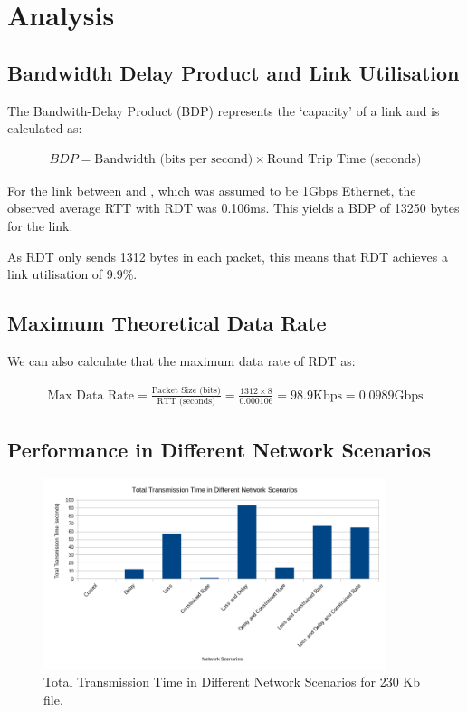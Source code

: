 \section{Analysis}

\subsection{Bandwidth Delay Product and Link Utilisation}
\label{sec:link}

The Bandwith-Delay Product (BDP) represents the `capacity' of a link and is calculated as:

\begin{align*}
    BDP = \text{Bandwidth (bits per second)} \times \text{Round Trip Time (seconds)}
\end{align*}

For the link between  and , which was assumed to be 1Gbps Ethernet, the observed average RTT with RDT was 0.106ms. This yields a BDP of 13250 bytes for the link.

As RDT only sends 1312 bytes in each packet, this means that RDT achieves a link utilisation of 9.9\%.

\subsection{Maximum Theoretical Data Rate}

We can also calculate that the maximum data rate of RDT as: 

\begin{align*}
    \text{Max Data Rate} = \frac{\text{Packet Size (bits)}}{\text{RTT (seconds)}} = \frac{1312 \times 8}{0.000106} = 98.9 \text{Kbps} = 0.0989 \text{Gbps} 
\end{align*}

\subsection{Performance in Different Network Scenarios}
\label{sec:performance}

\begin{figure}[H]
\begin{center}
    \includegraphics[width=100mm]{images/performance-network-scenarios.png}
\end{center}
\caption{Total Transmission Time in Different Network Scenarios for 230 Kb file.}\label{fig:performance}
\end{figure}

